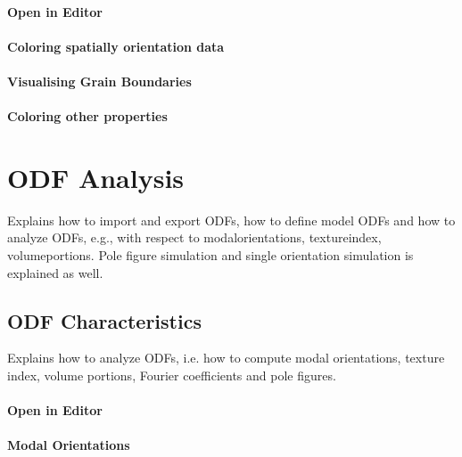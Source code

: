 \documentclass{article}
\begin{document}
                  
			\paragraph{Open in Editor}
		
			\paragraph{Coloring spatially orientation data}
		
			\paragraph{Visualising Grain Boundaries}
		
			\paragraph{Coloring other properties}
		
		\section{ODF Analysis}

		
                  \begin{par}
Explains how to import and export ODFs, how to define model ODFs and how to analyze ODFs, e.g., with respect to modalorientations, textureindex, volumeportions. Pole figure simulation and single orientation simulation is explained as well.
\end{par} \vspace{1em}

               
		\subsection{ODF Characteristics}

		
                     \begin{par}
Explains how to analyze ODFs, i.e. how to compute modal orientations, texture index, volume portions, Fourier coefficients and pole figures.
\end{par} \vspace{1em}

                  
			\paragraph{Open in Editor}
		
			\paragraph{Modal Orientations}
		
\end{document}
